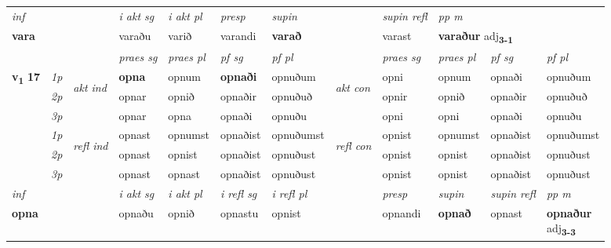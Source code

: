\begin{longtable}[l]{X>{\footnotesize\itshape}llXXXXlXXXX}
   {\textit{inf}} & &  & \textit{i akt sg} & \textit{i akt pl}   & \textit{presp} & \textit{supin} && \textit{supin refl} & \textit{pp m} \\*
  {\textbf{vara}} & && varaðu  & varið   & varandi &  \textbf{varað} && varast & \multicolumn{2}{l}{\textbf{varaður} adj\textbf{\textsubscript{3-1}}} \\*

\midrule

 & &   & \textit{praes sg}  & \textit{praes pl}    & \textit{ pf sg} & \textit{pf pl} & & \textit{praes sg}  & \textit{praes pl}    & \textit{pf sg} & \textit{pf pl }  \\ \cmidrule{4-7} \cmidrule{9-12}
 \multirow{2}{*}{{{\textbf{v{\textsubscript{1}}} \Large{\textbf{17}}}}}  & 1p & \multirow{3}{*}{\begin{turn}{90}\textit{akt ind}\end{turn}} & \textbf{opna} & opnum & \textbf{opnaði} & opnuðum & \multirow{3}{*}{\begin{turn}{90}\textit{akt con}\end{turn}} &opni & opnum & opnaði & opnuðum\\*
 & 2p &  &  opnar  & opnið & opnaðir & opnuðuð & & opnir & opnið & opnaðir & opnuðuð \\*
 & 3p &  & opnar & opna & opnaði & opnuðu & & opni & opni& opnaði & opnuðu \\*
\cmidrule{4-7} \cmidrule{9-12}
 & 1p & \multirow{3}{*}{\begin{turn}{90}\textit{refl ind}\end{turn}}  & opnast & opnumst & opnaðist & opnuðumst & \multirow{3}{*}{\begin{turn}{90}\textit{refl con}\end{turn}}  &opnist & opnumst & opnaðist & opnuðumst \\*
 & 2p &  & opnast & opnist & opnaðist & opnuðust & &opnist & opnist & opnaðist & opnuðust \\*
 & 3p  & & opnast & opnast & opnaðist & opnuðust & & opnist & opnist& opnaðist & opnuðust \\*
\cmidrule{4-7} \cmidrule{9-12}

   {\textit{inf}} & &  & \textit{i akt sg} & \textit{i akt pl} & \textit{i refl sg} & \textit{i refl pl} && \textit{presp} & \textit{supin} & \textit{supin refl} & \textit{pp m} \\*
  {\textbf{opna}} & && opnaðu  & opnið & opnastu & opnist && opnandi &  \textbf{opnað} & opnast & \specialcell{\textbf{opnaður} \\ adj\textbf{\textsubscript{3-3}}} \\*


\end{longtable}
